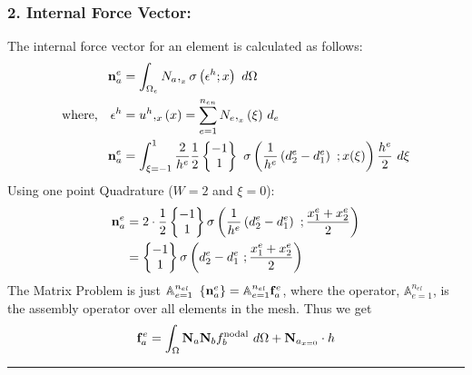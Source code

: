 \documentclass[11pt]{article}
\begin{document}
\subsubsection*{2. Internal Force Vector: }
The internal force vector for an element is calculated as follows: 
\begin{align*}
{\bf n}^e_a 
& =
\int_{\Omega_e}
N_a,_{_x} \sigma \left(\epsilon^h; x \right)\ d\Omega \\
\text{where,} \ \ \ \epsilon^h & = u^h,_x (x) = \sum_{e = 1}^{n_{en}} N_e,_{_x} (\xi) \ d_e \\ 
{{\bf n}^e_a} & = \int_{\xi = -1}^{1} \frac{2}{h^e} \frac{1}{2}\begin{Bmatrix} 
-1 \\1
\end{Bmatrix}
\ \sigma \left( \frac{1}{h^e} \left( d^e_2 - d^e_1 \right)\ ;x(\xi)  \right) \frac{h^e}{2}\  d\xi
\end{align*}
Using one point Quadrature ($W = 2$ and $\xi = 0$): 
\begin{align*}
{\bf n}^e_a & = 2 \cdot \frac{1}{2} \begin{Bmatrix}
-1\\1
\end{Bmatrix}
\sigma \left( \frac{1}{h^e} \left( d^e_2 - d^e_1 \right)\ ;\frac{x^e_1 + x^e_2}{2}  \right) \\
& =  
\begin{Bmatrix}
-1\\1
\end{Bmatrix}
\sigma \left( d^e_2 - d^e_1 \ ;\frac{x^e_1 + x^e_2}{2}  \right)
\end{align*}
The Matrix Problem is just $\mathbb{A}^{n_{el}}_{e=1} \ \left\{ {\bf n}^e_a \right\}= \mathbb{A}^{n_{el}}_{e=1} {\bf f}^{e}_a$, where the operator, $\mathbb{A}^{n_{el}}_{e=1}$, is the assembly operator over all elements in the mesh. Thus we get
\begin{align*}
{\bf f}^e_a = \int_{\Omega} {\bf N}_a {\bf N}_b f^{\rm nodal}_b\ d\Omega + {\bf N}_{a_{x= 0}} \cdot h
\end{align*} \hrule
\end{document}
